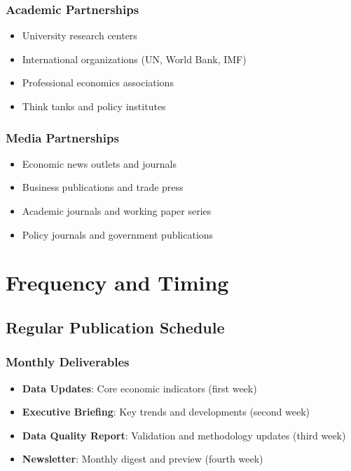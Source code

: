 \documentclass[11pt,a4paper]{article}
\begin{document}
\subsubsection{Academic Partnerships}
\begin{itemize}
    \item University research centers
    \item International organizations (UN, World Bank, IMF)
    \item Professional economics associations
    \item Think tanks and policy institutes
\end{itemize}

\subsubsection{Media Partnerships}
\begin{itemize}
    \item Economic news outlets and journals
    \item Business publications and trade press
    \item Academic journals and working paper series
    \item Policy journals and government publications
\end{itemize}

\section{Frequency and Timing}

\subsection{Regular Publication Schedule}

\subsubsection{Monthly Deliverables}
\begin{itemize}
    \item \textbf{Data Updates}: Core economic indicators (first week)
    \item \textbf{Executive Briefing}: Key trends and developments (second week)
    \item \textbf{Data Quality Report}: Validation and methodology updates (third week)
    \item \textbf{Newsletter}: Monthly digest and preview (fourth week)
\end{itemize}
\end{document}
